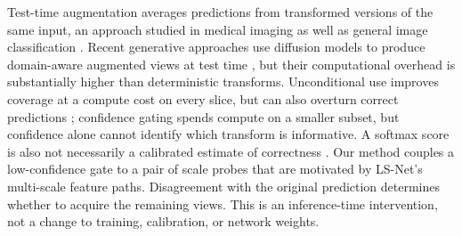 Test-time augmentation averages predictions from transformed versions of the same input, an approach studied in medical imaging as well as general image classification \cite{wang2019,moshkov2020,shanmugam2021}. Recent generative approaches use diffusion models to produce domain-aware augmented views at test time \cite{ma2026}, but their computational overhead is substantially higher than deterministic transforms. Unconditional use improves coverage at a compute cost on every slice, but can also overturn correct predictions \cite{shanmugam2021}; confidence gating spends compute on a smaller subset, but confidence alone cannot identify which transform is informative. A softmax score is also not necessarily a calibrated estimate of correctness \cite{guo2017}. Our method couples a low-confidence gate to a pair of scale probes that are motivated by LS-Net's multi-scale feature paths. Disagreement with the original prediction determines whether to acquire the remaining views. This is an inference-time intervention, not a change to training, calibration, or network weights.
